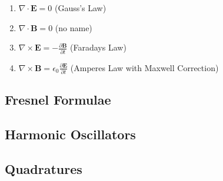\documentclass[11pt]{article}
\theoremstyle{definition}
\begin{document}
\begin{shaded}
\renewcommand{\labelenumi}{\alph{enumi})}
\begin{enumerate}
\item $\nabla \cdot \textbf{E} = 0$ (Gauss's Law) \newline
\item $\nabla \cdot \textbf{B} = 0$ (no name) \newline
\item $\nabla \times \textbf{E} = -\frac{\partial \textbf{B}}{\partial t}$ (Faradays Law) \newline
\item $\nabla \times \textbf{B} = \epsilon_0 \frac{\partial \textbf{E}}{\partial t}$ (Amperes Law with Maxwell Correction) \newline
\end{enumerate}
\end{shaded}

\subsection{Fresnel Formulae}

\subsection{Harmonic Oscillators}

\subsection{Quadratures}
\end{document}
